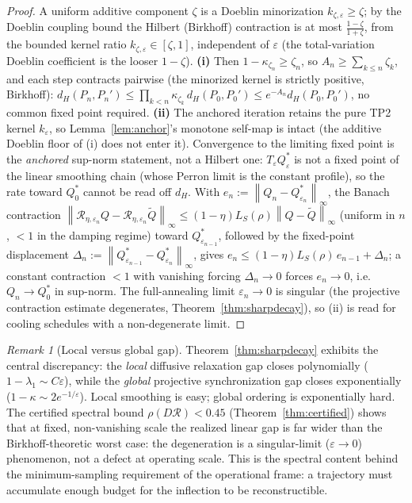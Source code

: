 \documentclass[11pt]{article}
\theoremstyle{plain}
\theoremstyle{definition}
\theoremstyle{remark}
\newtheorem{remark}[theorem]{Remark}
\newcommand{\norm}[1]{\left\lVert#1\right\rVert}
\newcommand{\Rc}{\mathcal R}
\begin{document}
\begin{proof}
A uniform additive component $\zeta$ is a Doeblin minorization $k_{\zeta,\varepsilon}\ge\zeta$; by the Doeblin coupling bound \citep{doeblin1937,seneta2006} the Hilbert (Birkhoff) contraction is at most $\frac{1-\zeta}{1+\zeta}$, from the bounded kernel ratio $k_{\zeta,\varepsilon}\in[\zeta,1]$, independent of $\varepsilon$ (the total-variation Doeblin coefficient is the looser $1-\zeta$). \textbf{(i)} Then $1-\kappa_{\zeta_n}\ge\zeta_n$, so $A_n\ge\sum_{k\le n}\zeta_k$, and each step contracts pairwise (the minorized kernel is strictly positive, Birkhoff): $d_H(P_n,P_n')\le\prod_{k<n}\kappa_{\zeta_k}\,d_H(P_0,P_0')\le e^{-A_n}d_H(P_0,P_0')$, no common fixed point required. \textbf{(ii)} The anchored iteration retains the pure TP2 kernel $k_\varepsilon$, so Lemma~\ref{lem:anchor}'s monotone self-map is intact (the additive Doeblin floor of (i) does not enter it). Convergence to the limiting fixed point is the \emph{anchored} sup-norm statement, not a Hilbert one: $T_\varepsilon Q^*_\varepsilon$ is not a fixed point of the linear smoothing chain (whose Perron limit is the constant profile), so the rate toward $Q^*_0$ cannot be read off $d_H$. With $e_n:=\norm{Q_n-Q^*_{\varepsilon_n}}_\infty$, the Banach contraction $\norm{\Rc_{\eta,\varepsilon_n}Q-\Rc_{\eta,\varepsilon_n}\widetilde Q}_\infty\le(1-\eta)L_S(\rho)\norm{Q-\widetilde Q}_\infty$ (uniform in $n$, $<1$ in the damping regime) toward $Q^*_{\varepsilon_{n-1}}$, followed by the fixed-point displacement $\Delta_n:=\norm{Q^*_{\varepsilon_{n-1}}-Q^*_{\varepsilon_n}}_\infty$, gives $e_n\le(1-\eta)L_S(\rho)\,e_{n-1}+\Delta_n$; a constant contraction $<1$ with vanishing forcing $\Delta_n\to0$ forces $e_n\to0$, i.e.\ $Q_n\to Q^*_0$ in sup-norm. The full-annealing limit $\varepsilon_n\to0$ is singular (the projective contraction estimate degenerates, Theorem~\ref{thm:sharpdecay}), so (ii) is read for cooling schedules with a non-degenerate limit.
\end{proof}

\begin{remark}[Local versus global gap]
Theorem~\ref{thm:sharpdecay} exhibits the central discrepancy: the \emph{local} diffusive relaxation gap closes polynomially ($1-\lambda_1\sim C\varepsilon$), while the \emph{global} projective synchronization gap closes exponentially ($1-\kappa\sim2e^{-1/\varepsilon}$). Local smoothing is easy; global ordering is exponentially hard. The certified spectral bound $\rho(D\Rc)<0.45$ (Theorem~\ref{thm:certified}) shows that at fixed, non-vanishing scale the realized linear gap is far wider than the Birkhoff-theoretic worst case: the degeneration is a singular-limit ($\varepsilon\to0$) phenomenon, not a defect at operating scale. This is the spectral content behind the minimum-sampling requirement of the operational frame: a trajectory must accumulate enough budget for the inflection to be reconstructible.
\end{remark}
\end{document}
